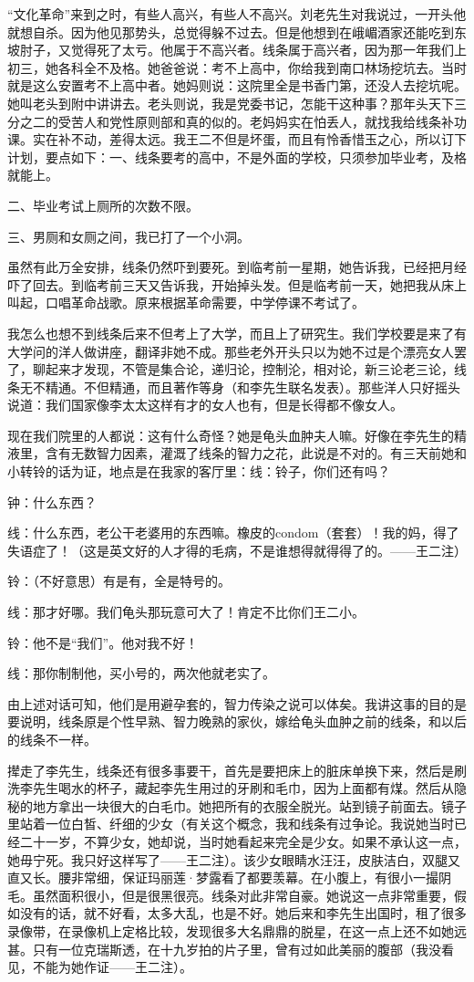 “文化革命”来到之时，有些人高兴，有些人不高兴。刘老先生对我说过，一开头他就想自杀。因为他见那势头，总觉得躲不过去。但是他想到在峨嵋酒家还能吃到东坡肘子，又觉得死了太亏。他属于不高兴者。线条属于高兴者，因为那一年我们上初三，她各科全不及格。她爸爸说：考不上高中，你给我到南口林场挖坑去。当时就是这么安置考不上高中者。她妈则说：这院里全是书香门第，还没人去挖坑呢。她叫老头到附中讲讲去。老头则说，我是党委书记，怎能干这种事？那年头天下三分之二的受苦人和党性原则部和真的似的。老妈妈实在怕丢人，就找我给线条补功课。实在补不动，差得太远。我王二不但是坏蛋，而且有怜香惜玉之心，所以订下计划，要点如下：一、线条要考的高中，不是外面的学校，只须参加毕业考，及格就能上。 

二、毕业考试上厕所的次数不限。 

三、男厕和女厕之间，我已打了一个小洞。 

虽然有此万全安排，线条仍然吓到要死。到临考前一星期，她告诉我，已经把月经吓了回去。到临考前三天又告诉我，开始掉头发。但是临考前一天，她把我从床上叫起，口唱革命战歌。原来根据革命需要，中学停课不考试了。 

我怎么也想不到线条后来不但考上了大学，而且上了研究生。我们学校要是来了有大学问的洋人做讲座，翻译非她不成。那些老外开头只以为她不过是个漂亮女人罢了，聊起来才发现，不管是集合论，递归论，控制沦，相对论，新三论老三论，线条无不精通。不但精通，而且著作等身（和李先生联名发表）。那些洋人只好摇头说道：我们国家像李太太这样有才的女人也有，但是长得都不像女人。 


现在我们院里的人都说：这有什么奇怪？她是龟头血肿夫人嘛。好像在李先生的精液里，含有无数智力因素，灌溉了线条的智力之花，此说是不对的。有三天前她和小转铃的话为证，地点是在我家的客厅里：线：铃子，你们还有吗？ 

钟：什么东西？ 

线：什么东西，老公干老婆用的东西嘛。橡皮的condom（套套）！我的妈，得了失语症了！（这是英文好的人才得的毛病，不是谁想得就得得了的。——王二注） 

铃：（不好意思）有是有，全是特号的。 

线：那才好哪。我们龟头那玩意可大了！肯定不比你们王二小。 

铃：他不是“我们”。他对我不好！ 

线：那你制制他，买小号的，两次他就老实了。 

由上述对话可知，他们是用避孕套的，智力传染之说可以体矣。我讲这事的目的是要说明，线条原是个性早熟、智力晚熟的家伙，嫁给龟头血肿之前的线条，和以后的线条不一样。 

撵走了李先生，线条还有很多事要干，首先是要把床上的脏床单换下来，然后是刷洗李先生喝水的杯子，藏起李先生用过的牙刷和毛巾，因为上面都有煤。然后从隐秘的地方拿出一块很大的白毛巾。她把所有的衣服全脱光。站到镜子前面去。镜子里站着一位白皙、纤细的少女（有关这个概念，我和线条有过争论。我说她当时已经二十一岁，不算少女，她却说，当时她看起来完全是少女。如果不承认这一点，她毋宁死。我只好这样写了——王二注）。该少女眼睛水汪汪，皮肤洁白，双腿又直又长。腰非常细，保证玛丽莲·梦露看了都要羡幕。在小腹上，有很小一撮阴毛。虽然面积很小，但是很黑很亮。线条对此非常自豪。她说这一点非常重要，假如没有的话，就不好看，太多大乱，也是不好。她后来和李先生出国时，租了很多录像带，在录像机上定格比较，发现很多大名鼎鼎的脱星，在这一点上还不如她远甚。只有一位克瑞斯透，在十九岁拍的片子里，曾有过如此美丽的腹部（我没看见，不能为她作证——王二注）。 


